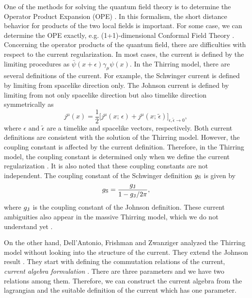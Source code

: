 \documentclass[a4paper,fleqn]{article}
\begin{document}
One of the methods for solving the quantum field theory is to determine the Operator Product 
Expansion (OPE) \cite{wilson69,kad69}. In this formalism, the short distance behavior 
for products of the two local fields is important. For some case, we can determine the 
OPE exactly, e.g. (1+1)-dimensional Conformal Field Theory \cite{bel_pol_zam84}.
Concerning the operator products of the quantum field,
there are difficulties with respect to the current regularization. 
In most cases, the current is defined by the limiting procedures as 
$\bar\psi(x+\epsilon)\gamma_\mu\psi(x)$. In the Thirring model, there are 
several definitions of the current. 
For example, the Schwinger current \cite{sch59} is defined by limiting from
spacelike direction only. The Johnson current \cite{joh61}
is defined by limiting from not only spacelike direction but
 also timelike direction symmetrically as
\begin{equation}
j^\mu (x) = \frac{1}{2} \biggl[j^\mu(x;\, \epsilon)
          + j^\mu(x;\, \widetilde\epsilon) 
         \biggr]_{\epsilon, \widetilde\epsilon \rightarrow 0},
\end{equation}
where $\epsilon$ and $\widetilde\epsilon$ are a timelike and spacelike
vectors, respectively.
Both current definitions are consistent with the solution of the Thirring model.
However, the coupling constant is affected by the current definition.
Therefore, in the Thirring model, the coupling constant is determined only when 
we define the current regularization \cite{kla67}. It is also noted that
these coupling constants are not independent. The coupling constant of 
the Schwinger definition $g_{\rm S}$ is given by
\begin{equation}
g_{\rm S} = \frac{g_{\rm J}}{1 - g_{\rm J}/2 \pi},
\end{equation}
where $g_{\rm J}$ is the coupling constant of the Johnson definition.
These current ambiguities also appear in the massive Thirring model, which
we do not understand yet \cite{fkt2000}.

On the other hand, Dell'Antonio, Frishman and Zwanziger \cite{del_fri_zwa} 
analyzed the Thirring model without looking into the structure of the current.
They extend the Johnson result \cite{joh61}.
They start with defining the commutation relations of the current, 
{\it current algebra formulation} \cite{wilson69,kad69}.
There are three parameters and we have two relations among them.
Therefore, we can construct the current algebra from the lagrangian and 
the suitable definition of the current which has one parameter.
\end{document}

